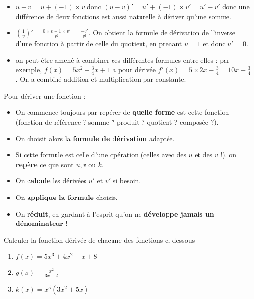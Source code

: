 \documentclass[a4paper,11pt]{article}
\begin{document}
\begin{crmq}[s]
\vspace{-0.2cm}
\begin{itemize}[leftmargin=*]
	\item $u-v=u+(-1)\times v$ donc $(u-v)'=u'+(-1)\times v'=u'-v'$ donc une différence de deux fonctions est aussi naturelle à dériver qu'une somme.
	\item $\left( \frac{1}{v}\right)'=\frac{0 \times v - 1 \times v'}{v^2} = \frac{-v'}{v^2}$. On obtient la formule de dérivation de l'inverse d'une fonction à partir de celle du quotient, en prenant $u=1$ et donc $u'=0$.
	\item on peut être amené à combiner ces différentes formules entre elles : par exemple, $f(x)=5x^2-\frac{3}{4}x +1 $ a pour dérivée $f'(x)=5 \times 2x - \frac{3}{4}=10x-\frac{3}{4}$. On a combiné addition et multiplication par constante. 
\end{itemize}
\end{crmq}

\begin{cmethode}
Pour dériver une fonction :
\begin{itemize}[leftmargin=*]
	\item On commence toujours par repérer de \textbf{quelle forme }est cette fonction (fonction de référence ? somme ? produit ? quotient ? composée ?).
	\item On choisit alors la \textbf{formule de dérivation} adaptée.
	\item Si cette formule est celle d'une opération (celles avec des $u$ et des $v$ !), on \textbf{repère} ce que sont $u, v$ ou $k$.
	\item On \textbf{calcule} les dérivées $u'$ et $v'$ si besoin.
	\item On\textbf{ applique la formule} choisie.
	\item On \textbf{réduit}, en gardant à l'esprit qu'on ne \textbf{développe jamais un dénominateur} !
\end{itemize}
\end{cmethode}

\begin{cexercice}
Calculer la fonction dérivée de chacune des fonctions ci-dessous : 
\begin{enumerate}
	\item $f(x)=5x^3+4x^2-x+8$
	\item $g(x)=\frac{x^2}{3x-2}$
	\item $k(x)=x^5(3x^2+5x)$
\end{enumerate}
\end{cexercice}
\end{document}

